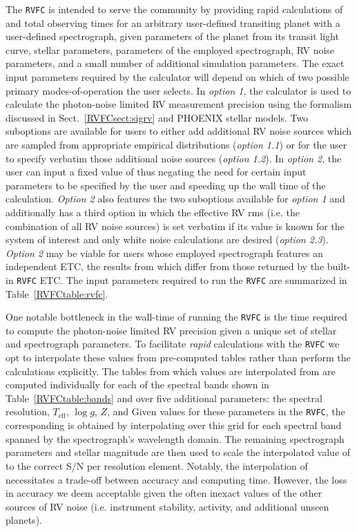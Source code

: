 The \texttt{RVFC} is intended to serve the community by providing rapid calculations of
\nrv{} and total observing times for an arbitrary user-defined transiting planet with a user-defined
spectrograph, given parameters of the planet from its
transit light curve, stellar parameters, parameters of the employed spectrograph, RV noise
parameters, and a small number of additional simulation parameters.
The exact input parameters required by the calculator will depend on which of two
possible primary modes-of-operation the user selects. In \emph{option 1}, the calculator is used to
calculate the photon-noise limited RV measurement precision \sigRV{} using the formalism discussed in
Sect.~\ref{RVFCsect:sigrv} and PHOENIX stellar models. Two suboptions are available for
users to either add additional RV noise sources which are sampled from appropriate empirical distributions
(\emph{option 1.1}) or for the user to specify verbatim those additional noise sources
(\emph{option 1.2}). In \emph{option 2}, the user can input a fixed value of \sigRV{} thus
negating the need for certain input parameters to be specified by the user and
speeding up the wall time of the calculation. \emph{Option 2} also features the two suboptions available
for \emph{option 1} and additionally has a third option in which the effective RV rms 
(i.e. the combination of all RV noise sources) is set verbatim if its value is known for the system of
interest and only white noise calculations are desired (\emph{option 2.3}).
\emph{Option 2} may be viable for users whose employed
spectrograph features an independent ETC, the results from which differ from those returned by
the built-in \texttt{RVFC} ETC. 
The input parameters required to run the \texttt{RVFC} are summarized in Table~\ref{RVFCtable:rvfc}.



One notable bottleneck in the wall-time of running the \texttt{RVFC} is the time required to compute
the photon-noise limited RV precision given a unique set of stellar and spectrograph parameters. To
facilitate \emph{rapid} calculations  with the \texttt{RVFC} we opt to interpolate these values from
pre-computed tables rather than perform the calculations explicitly. The tables from which \sigRV{}
values are interpolated from are computed individually
for each of the spectral bands shown in Table~\ref{RVFCtable:bands} and
over five additional parameters: the spectral resolution, $T_{\text{eff}}$, $\log{g}$, $Z$, and 
Given values for these parameters in the \texttt{RVFC}, the corresponding \sigRV{} is obtained by
interpolating over this grid for each spectral band spanned by the spectrograph's wavelength domain. 
The remaining spectrograph parameters and stellar magnitude are then used to scale the interpolated
value of \sigRV{} to the correct S/N per resolution element. Notably, 
the interpolation of \sigRV{} necessitates a trade-off between accuracy and computing time. However,
the loss in accuracy we deem acceptable given the often inexact values of the other sources of RV
noise (i.e. instrument stability, activity, and additional unseen planets).

